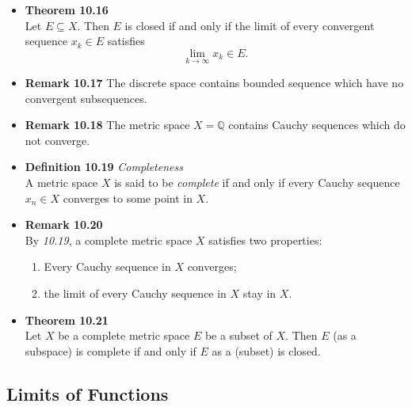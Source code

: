 \documentclass[11pt,a4paper]{article}
\begin{document}
\begin{itemize}
    \item \textbf{Theorem 10.16} \\
        Let $E \subseteq X$.
        Then $E$ is closed if and only if the limit of every convergent sequence $x_k \in E$
        satisfies
        \[
            \lim_{k \to \infty} x_k \in E.
        \]

    \item \textbf{Remark 10.17}
        The discrete space contains bounded sequence which have no convergent subsequences.

    \item \textbf{Remark 10.18}
        The metric space $X = \mathbb{Q}$ contains Cauchy sequences which do not converge.

    \item \textbf{Definition 10.19} \emph{Completeness} \\
        A metric space $X$ is said to be \emph{complete} if and only if every Cauchy sequence
        $x_n \in X$ converges to some point in $X$.

    \item \textbf{Remark 10.20} \\
        By \emph{10.19}, a complete metric space $X$ satisfies two properties:
        \begin{enumerate}
            \item Every Cauchy sequence in $X$ converges;
            \item the limit of every Cauchy sequence in $X$ stay in $X$.
        \end{enumerate}

    \item \textbf{Theorem 10.21} \\
        Let $X$ be a complete metric space $E$ be a subset of $X$.
        Then $E$ (as a subspace) is complete if and only if $E$ as a (subset) is closed.

\end{itemize}

\subsection{Limits of Functions}
\end{document}
